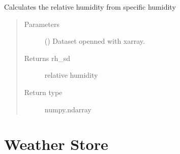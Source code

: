 \documentclass[a4paper,11pt,english]{sphinxmanual}
\begin{document}

\begin{fulllineitems}
\label{\detokenize{modules:envlib.calc_altrv_vars.get_rh_sd}}
Calculates the relative humidity from specific humidity
\begin{quote}\begin{description}
\item[{Parameters}] \leavevmode
{} () \textendash{} Dataset openned with xarray.

\item[{Returns rh\_sd}] \leavevmode
relative humidity

\item[{Return type}] \leavevmode
numpy.ndarray

\end{description}\end{quote}

\end{fulllineitems}



\section{Weather Store}
\label{\detokenize{modules:weather-store}}
\end{document}

